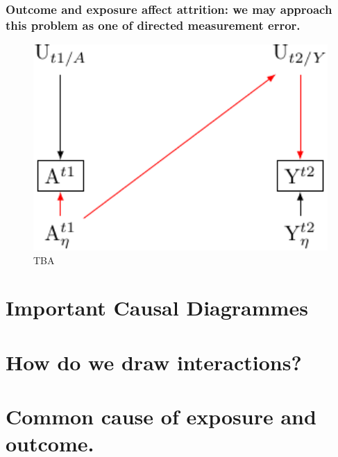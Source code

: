 \documentclass[
  singlecolumn]{report}
\begin{document}
\hypertarget{outcome-and-exposure-affect-attrition-we-may-approach-this-problem-as-one-of-directed-measurement-error.}{%
\subsubsection{Outcome and exposure affect attrition: we may approach
this problem as one of directed measurement
error.}\label{outcome-and-exposure-affect-attrition-we-may-approach-this-problem-as-one-of-directed-measurement-error.}}

\begin{figure}

{\centering \includegraphics[width=1\textwidth,height=\textheight]{causal-dags_files/figure-pdf/fig-directed-measurement-error-1.pdf}

}

\caption{\label{fig-directed-measurement-error}TBA}

\end{figure}

\hypertarget{important-causal-diagrammes}{%
\section{Important Causal
Diagrammes}\label{important-causal-diagrammes}}

\hypertarget{how-do-we-draw-interactions}{%
\section{How do we draw
interactions?}\label{how-do-we-draw-interactions}}

\hypertarget{common-cause-of-exposure-and-outcome.-1}{%
\section{Common cause of exposure and
outcome.}\label{common-cause-of-exposure-and-outcome.-1}}
\end{document}
